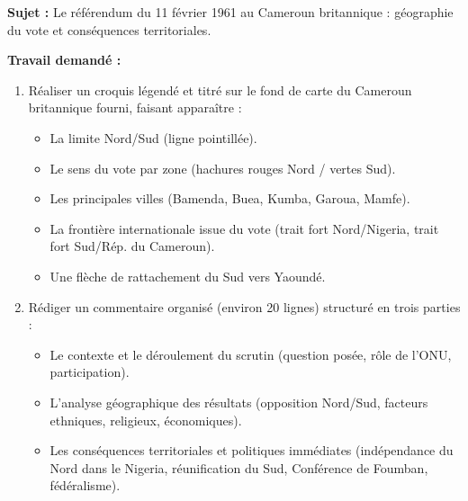 \documentclass[11pt]{article}
\begin{document}
\begin{exercice}
\textbf{Sujet :} Le référendum du 11 février 1961 au Cameroun britannique : géographie du vote et conséquences territoriales.

\textbf{Travail demandé :}
\begin{enumerate}
\item Réaliser un croquis légendé et titré sur le fond de carte du Cameroun britannique fourni, faisant apparaître :
      \begin{itemize}
      \item La limite Nord/Sud (ligne pointillée).
      \item Le sens du vote par zone (hachures rouges Nord / vertes Sud).
      \item Les principales villes (Bamenda, Buea, Kumba, Garoua, Mamfe).
      \item La frontière internationale issue du vote (trait fort Nord/Nigeria, trait fort Sud/Rép. du Cameroun).
      \item Une flèche de rattachement du Sud vers Yaoundé.
      \end{itemize}
\item Rédiger un commentaire organisé (environ 20 lignes) structuré en trois parties :
      \begin{itemize}
      \item Le contexte et le déroulement du scrutin (question posée, rôle de l'ONU, participation).
      \item L'analyse géographique des résultats (opposition Nord/Sud, facteurs ethniques, religieux, économiques).
      \item Les conséquences territoriales et politiques immédiates (indépendance du Nord dans le Nigeria, réunification du Sud, Conférence de Foumban, fédéralisme).
      \end{itemize}
\end{enumerate}
\end{exercice}
\end{document}
